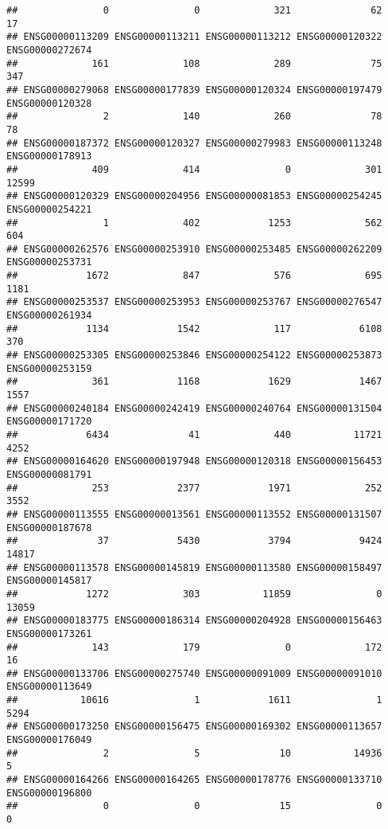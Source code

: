 \documentclass[
]{article}
\begin{document}
\begin{verbatim}
##               0               0             321              62              17 
## ENSG00000113209 ENSG00000113211 ENSG00000113212 ENSG00000120322 ENSG00000272674 
##             161             108             289              75             347 
## ENSG00000279068 ENSG00000177839 ENSG00000120324 ENSG00000197479 ENSG00000120328 
##               2             140             260              78              78 
## ENSG00000187372 ENSG00000120327 ENSG00000279983 ENSG00000113248 ENSG00000178913 
##             409             414               0             301           12599 
## ENSG00000120329 ENSG00000204956 ENSG00000081853 ENSG00000254245 ENSG00000254221 
##               1             402            1253             562             604 
## ENSG00000262576 ENSG00000253910 ENSG00000253485 ENSG00000262209 ENSG00000253731 
##            1672             847             576             695            1181 
## ENSG00000253537 ENSG00000253953 ENSG00000253767 ENSG00000276547 ENSG00000261934 
##            1134            1542             117            6108             370 
## ENSG00000253305 ENSG00000253846 ENSG00000254122 ENSG00000253873 ENSG00000253159 
##             361            1168            1629            1467            1557 
## ENSG00000240184 ENSG00000242419 ENSG00000240764 ENSG00000131504 ENSG00000171720 
##            6434              41             440           11721            4252 
## ENSG00000164620 ENSG00000197948 ENSG00000120318 ENSG00000156453 ENSG00000081791 
##             253            2377            1971             252            3552 
## ENSG00000113555 ENSG00000013561 ENSG00000113552 ENSG00000131507 ENSG00000187678 
##              37            5430            3794            9424           14817 
## ENSG00000113578 ENSG00000145819 ENSG00000113580 ENSG00000158497 ENSG00000145817 
##            1272             303           11859               0           13059 
## ENSG00000183775 ENSG00000186314 ENSG00000204928 ENSG00000156463 ENSG00000173261 
##             143             179               0             172              16 
## ENSG00000133706 ENSG00000275740 ENSG00000091009 ENSG00000091010 ENSG00000113649 
##           10616               1            1611               1            5294 
## ENSG00000173250 ENSG00000156475 ENSG00000169302 ENSG00000113657 ENSG00000176049 
##               2               5              10           14936               5 
## ENSG00000164266 ENSG00000164265 ENSG00000178776 ENSG00000133710 ENSG00000196800 
##               0               0              15               0               0 

\end{verbatim}
\end{document}
